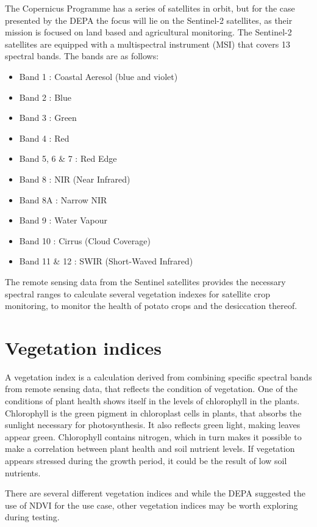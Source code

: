 The Copernicus Programme has a series of satellites in orbit, but for the case presented by the \acrshort{DEPA} the focus will lie on the Sentinel-2 satellites, as their mission is focused on land based and agricultural monitoring. The Sentinel-2 satellites are equipped with a multispectral instrument (MSI) that covers 13 spectral bands. 
The bands are as follows\cite{sentiwiki_sentinel2}:
\begin{itemize}
    \item Band 1 : Coastal Aeresol (blue and violet)
    \item Band 2 : Blue
    \item Band 3 : Green
    \item Band 4 : Red
    \item Band 5, 6 \& 7 : Red Edge
    \item Band 8 : NIR (Near Infrared)
    \item Band 8A : Narrow NIR
    \item Band 9 : Water Vapour
    \item Band 10 : Cirrus (Cloud Coverage)
    \item Band 11 \& 12 : SWIR (Short-Waved Infrared)
\end{itemize}
The remote sensing data from the Sentinel satellites provides the necessary spectral ranges to calculate several vegetation indexes for satellite crop monitoring, to monitor the health of potato crops and the desiccation thereof\cite{softfarm_vegetation_indices}.

\section{Vegetation indices}\label{Vegetation indices}
A vegetation index is a calculation derived from combining specific spectral bands from remote sensing data, that reflects the condition of vegetation\cite{softfarm_vegetation_indices}. 
One of the conditions of plant health shows itself in the levels of chlorophyll in the plants. Chlorophyll is the green pigment in chloroplast cells in plants, that absorbs the sunlight necessary for photosynthesis. It also reflects green light, making leaves appear green\cite{byjus_chlorophyll}. Chlorophyll contains nitrogen, which in turn makes it possible to make a correlation between plant health and soil nutrient levels. If vegetation appears stressed during the growth period, it could be the result of low soil nutrients\cite{eos_ndre}.

There are several different vegetation indices and while the \acrshort{DEPA} suggested the use of NDVI for the use case, other vegetation indices may be worth exploring during testing.

